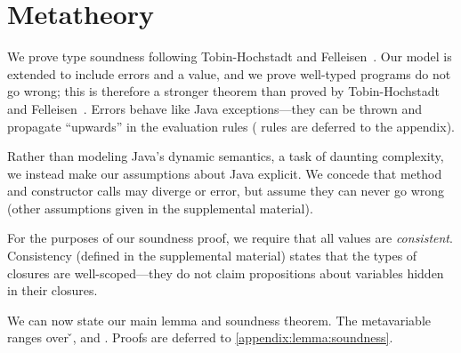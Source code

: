 \section{Metatheory}
\label{sec:metatheory}

We prove type soundness following Tobin-Hochstadt and Felleisen~\cite{TF10}.  Our model is extended
to include errors \errorvalv{} and a \wrong{} value, and we prove well-typed
programs do not go wrong; this is therefore a stronger theorem than
proved by Tobin-Hochstadt and Felleisen~\cite{TF10}. 
Errors behave like Java exceptions---they can be thrown and propagate ``upwards'' in the evaluation rules
(\errorvalv{} rules are deferred to the appendix).

Rather than modeling Java's dynamic semantics, a task of daunting
complexity, we instead make our assumptions about Java explicit. We
concede that method and constructor calls may diverge or error, but
assume they can never go wrong
(other assumptions given in the supplemental material).

{}



For the purposes of our soundness proof, we require that all values
are \emph{consistent}.  Consistency (defined in the supplemental
material) states that the types of closures are well-scoped---they do
not claim propositions about variables hidden in their closures.


We can now state our main lemma and soundness theorem.  The
metavariable  ranges over \v{}, \errorvalv{} and
\wrong{}. Proofs are deferred to \ref{appendix:lemma:soundness}.

\begin{lemma}\label{main:lemma:soundness}

  {\soundnesslemmahypothesis}
\end{lemma}



{}

%
